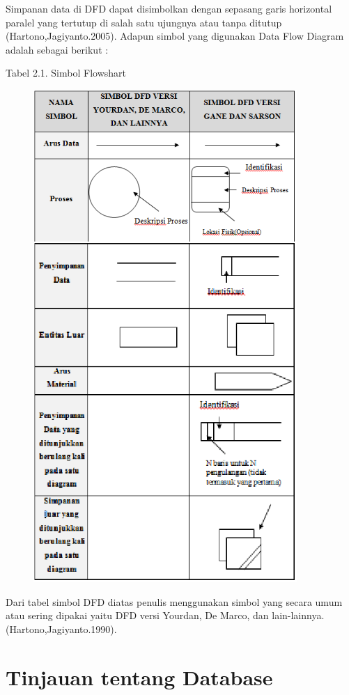\documentclass{jtetiproposalskripsi}
\begin{document}
Simpanan data di DFD dapat disimbolkan dengan sepasang garis horizontal paralel yang tertutup di salah satu ujungnya atau tanpa ditutup (Hartono,Jagiyanto.2005). Adapun simbol yang digunakan Data Flow Diagram adalah sebagai berikut :
\begin{center}
Tabel 2.1. Simbol Flowshart
\end{center}
\vspace{-0.5cm}
\begin{figure}[ht!]
  \centering
    \includegraphics[width=10cm]{gambar/4}
\end{figure}

Dari tabel simbol DFD diatas penulis menggunakan simbol yang secara umum atau sering dipakai yaitu DFD versi Yourdan, De Marco, dan lain-lainnya.(Hartono,Jagiyanto.1990).
\section{Tinjauan tentang Database}
\end{document}
